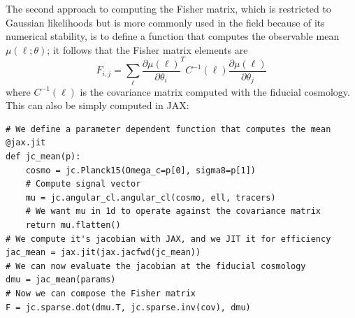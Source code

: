 \documentclass[twocolumn,twocolappendix,nofootinbib,iop]{openjournal}
\newcommand{\JZ}[1]{{\color{purple}JZ: #1}}
\begin{document}
The second approach to computing the Fisher matrix, which is restricted to Gaussian likelihoods but is more commonly used in the field because of its numerical stability, is to define a function that computes the observable mean  $\mu(\ell; \theta)$; it follows that the Fisher matrix elements are
\begin{equation}
    F_{i,j} = \sum_\ell \frac{\partial \mu(\ell)}{\partial \theta_i}^T C^{-1}(\ell)\frac{\partial \mu(\ell)}{\partial \theta_j}
    \label{eq:fisher_way2}
\end{equation}
where $C^{-1}(\ell)$ is the covariance matrix computed with the fiducial cosmology. This can also be simply computed in JAX: 
\begin{lstlisting}[language=iPython]
# We define a parameter dependent function that computes the mean
@jax.jit
def jc_mean(p):
    cosmo = jc.Planck15(Omega_c=p[0], sigma8=p[1])
    # Compute signal vector
    mu = jc.angular_cl.angular_cl(cosmo, ell, tracers)
    # We want mu in 1d to operate against the covariance matrix
    return mu.flatten() 
# We compute it's jacobian with JAX, and we JIT it for efficiency
jac_mean = jax.jit(jax.jacfwd(jc_mean))
# We can now evaluate the jacobian at the fiducial cosmology
dmu = jac_mean(params)
# Now we can compose the Fisher matrix
F = jc.sparse.dot(dmu.T, jc.sparse.inv(cov), dmu)
\end{lstlisting}
\end{document}
